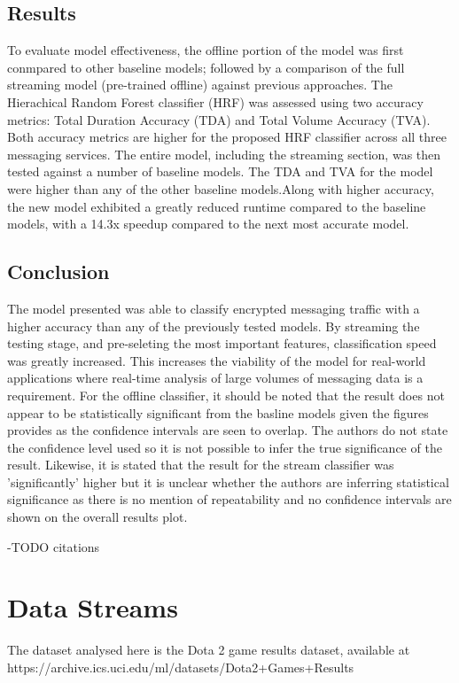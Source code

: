 \documentclass[10pt]{article}
\begin{document}
\subsection{Results}
To evaluate model effectiveness, the offline portion of the model was first conmpared to other baseline models; followed by a comparison of the full streaming model (pre-trained offline) against previous approaches. The Hierachical Random Forest classifier (HRF) was assessed using two accuracy metrics: Total Duration Accuracy (TDA) and Total Volume Accuracy (TVA). Both accuracy metrics are higher for the proposed HRF classifier across all three messaging services. 
The entire model, including the streaming section, was then tested against a number of baseline models. The TDA and TVA for the model were higher than any of the other baseline models.Along with higher accuracy, the new model exhibited a greatly reduced runtime compared to the baseline models, with a 14.3x speedup compared to the next most accurate model. 

\subsection{Conclusion}
The model presented was able to classify encrypted messaging traffic with a higher accuracy than any of the previously tested models. By streaming the testing stage, and pre-seleting the most important features, classification speed was greatly increased. This increases the viability of the model for real-world applications where real-time analysis of large volumes of messaging data is a requirement.
For the offline classifier, it should be noted that the result does not appear to be statistically significant from the basline models given the figures provides as the confidence intervals are seen to overlap. The authors do not state the confidence level used so it is not possible to infer the true significance of the result. Likewise,  it is stated that the result for the stream classifier was 'significantly' higher but it is unclear whether the authors are inferring statistical significance as there is no mention of repeatability and no confidence intervals are shown on the overall results plot.

-TODO citations


\section {Data Streams}

The dataset analysed here is the Dota 2 game results dataset, available at\\ https://archive.ics.uci.edu/ml/datasets/Dota2+Games+Results
\end{document}
